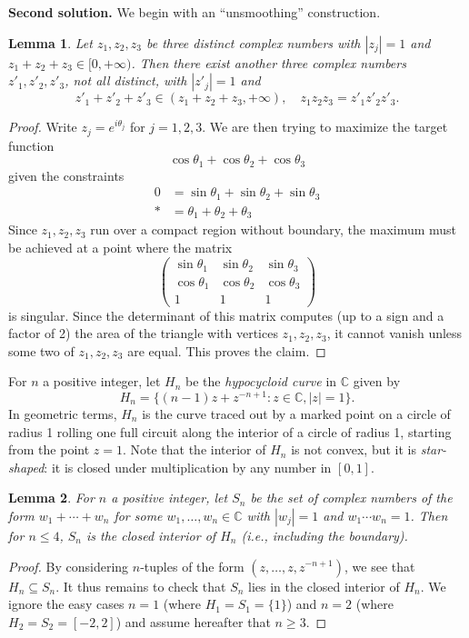 \documentclass[amssymb,twocolumn,pra,10pt,aps]{revtex4-1}
\newtheorem{lemma}{Lemma}
\newcommand{\CC}{\mathbb{C}}
\begin{document}
\begin{itemize}
\noindent
\textbf{Second solution.}
We begin with an ``unsmoothing'' construction.
\setcounter{lemma}{0}
\begin{lemma}
Let $z_1,z_2,z_3$ be three distinct complex numbers with $|z_j|= 1$ and $z_1 + z_2 + z_3 \in [0, +\infty)$. Then there exist another three complex numbers $z'_1, z'_2, z'_3$, not all distinct, with
$|z'_j| = 1$ and
\[
z'_1 + z'_2 + z'_3 \in (z_1+ z_2 + z_3, +\infty), \quad z_1 z_2 z_3 = z'_1 z'_2 z'_3.
\]
\end{lemma}
\begin{proof}
Write $z_j = e^{i \theta_j}$ for $j=1,2,3$. 
We are then trying to maximize the target function
\[
\cos \theta_1 + \cos \theta_2 + \cos \theta_3
\]
given the constraints
\begin{align*}
0 &= \sin \theta_1 + \sin \theta_2 + \sin \theta_3\\
* &= \theta_1 + \theta_2 + \theta_3
\end{align*}
Since $z_1, z_2, z_3$ run over a compact region without boundary, the maximum must be achieved at a point where the matrix
\[
\begin{pmatrix}
\sin \theta_1 & \sin \theta_2 & \sin \theta_3 \\
\cos \theta_1 & \cos \theta_2 & \cos \theta_3 \\
1 & 1 & 1
\end{pmatrix}
\]
is singular. Since the determinant of this matrix computes (up to a sign and a factor of 2) the area of the triangle with vertices $z_1, z_2, z_3$,
it cannot vanish unless some two of $z_1, z_2, z_3$ are equal. This proves the claim.
\end{proof}

For $n$ a positive integer, let $H_n$ be the \emph{hypocycloid curve} in $\CC$ given by
\[
H_n = \{(n-1) z + z^{-n+1}: z \in \CC, |z| = 1\}.
\]
In geometric terms, $H_n$ is the curve traced out by a marked point on a circle of radius 1 rolling one full circuit along the interior of a circle of radius 1, starting from the point $z=1$.
Note that the interior of $H_n$ is not convex, but it is \emph{star-shaped}: it is closed under multiplication by any number in $[0,1]$.

\begin{lemma}
For $n$ a positive integer, let $S_n$ be the set of complex numbers of the form $w_1 + \cdots + w_n$ for some $w_1,\dots,w_n \in \CC$ with
$|w_j| = 1$ and $w_1 \cdots w_n = 1$. Then for $n \leq 4$, $S_n$ is the closed interior of $H_n$ (i.e., including the boundary).
\end{lemma}
\begin{proof}
By considering $n$-tuples of the form $(z,\dots,z,z^{-n+1})$, we see that $H_n \subseteq S_n$.
It thus remains to check that $S_n$ lies in the closed interior of $H_n$.
We ignore the easy cases $n=1$ (where $H_1 = S_1 = \{1\}$) and $n=2$ (where $H_2 = S_2 = [-2,2]$)
and assume hereafter that $n \geq 3$.


\end{proof}
\end{itemize}
\end{document}

